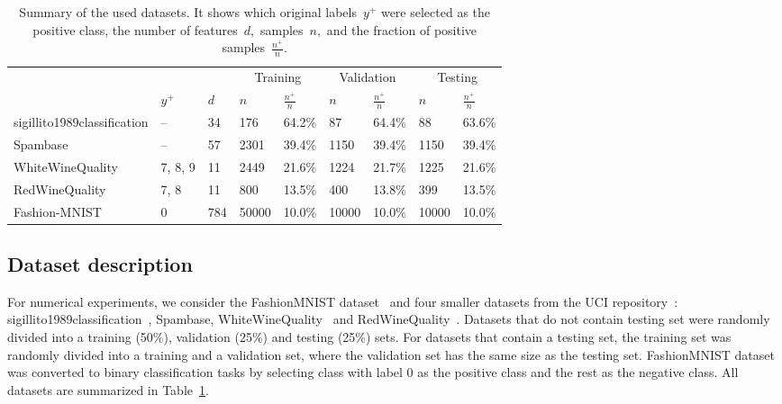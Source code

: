 \begin{table}[ht]
  \centering
  \begin{tabular}{@{}lllllllll@{}}
      \toprule
      &&& \multicolumn{2}{c}{Training}
        & \multicolumn{2}{c}{Validation}
        & \multicolumn{2}{c}{Testing} \\
      \cmidrule(lr){4-5} \cmidrule(lr){6-7} \cmidrule(l){8-9}
        & $y^+$
        & $d$
        & $n$
        & $\frac{n^+}{n}$
        & $n$
        & $\frac{n^+}{n}$
        & $n$
        & $\frac{n^+}{n}$ \\
      \midrule
      sigillito1989classification
        & -- & 34 & 176 & 64.2\% & 87 & 64.4\% & 88 & 63.6\% \\
      Spambase
        & -- & 57 & 2301 & 39.4\% & 1150 & 39.4\% & 1150 & 39.4\% \\
      WhiteWineQuality
        & 7, 8, 9 & 11 & 2449 & 21.6\% & 1224 & 21.7\% & 1225 & 21.6\% \\
      RedWineQuality
        & 7, 8 & 11 & 800 & 13.5\% & 400 & 13.8\% & 399 & 13.5\% \\
      Fashion-MNIST
        & 0 & 784 & 50000 & 10.0\% & 10000 & 10.0\% & 10000 & 10.0\% \\
      \bottomrule
  \end{tabular}
  \caption{Summary of the used datasets. It shows which original labels~$y^+$ were selected as the positive class, the number of features~$d,$ samples~$n,$ and the fraction of positive samples~$\frac{n^+}{n}$.}
  \label{tab:Datasets}
\end{table}

\subsection{Dataset description}

For numerical experiments, we consider the FashionMNIST dataset~\cite{xiao2017fashionmnist} and four smaller datasets from the UCI repository~\cite{dua2019uci}: sigillito1989classification~\cite{sigillito1989classification}, Spambase, WhiteWineQuality~\cite{cortez2009modeling} and RedWineQuality~\cite{cortez2009modeling}. Datasets that do not contain testing set were randomly divided into a training (50\%), validation (25\%) and testing (25\%) sets. For datasets that contain a testing set, the training set was randomly divided into a training and a validation set, where the validation set has the same size as the testing set. FashionMNIST dataset was converted to binary classification tasks by selecting class with label 0 as the positive class and the rest as the negative class. All datasets are summarized in Table~\ref{tab:Datasets}.

